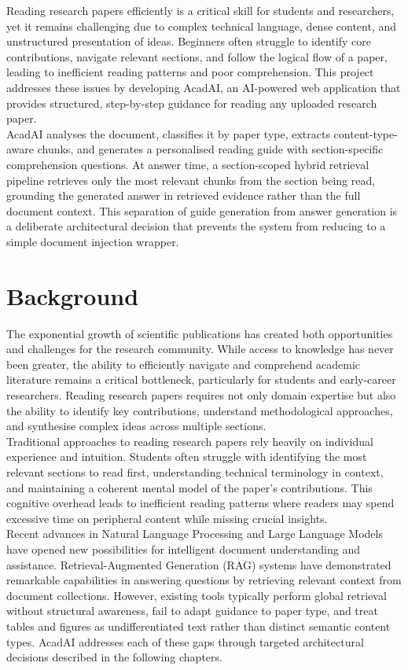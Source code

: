 \documentclass[12pt,a4paper]{report}
\begin{document}
Reading research papers efficiently is a critical skill for students and
researchers, yet it remains challenging due to complex technical language, dense
content, and unstructured presentation of ideas. Beginners often struggle to
identify core contributions, navigate relevant sections, and follow the logical
flow of a paper, leading to inefficient reading patterns and poor comprehension.
This project addresses these issues by developing AcadAI, an AI-powered web
application that provides structured, step-by-step guidance for reading any
uploaded research paper.\\
AcadAI analyses the document, classifies it by paper type, extracts
content-type-aware chunks, and generates a personalised reading guide with
section-specific comprehension questions. At answer time, a section-scoped
hybrid retrieval pipeline retrieves only the most relevant chunks from the
section being read, grounding the generated answer in retrieved evidence rather
than the full document context. This separation of guide generation from answer
generation is a deliberate architectural decision that prevents the system from
reducing to a simple document injection wrapper.

\section{Background}

The exponential growth of scientific publications has created both opportunities
and challenges for the research community. While access to knowledge has never
been greater, the ability to efficiently navigate and comprehend academic
literature remains a critical bottleneck, particularly for students and
early-career researchers. Reading research papers requires not only domain
expertise but also the ability to identify key contributions, understand
methodological approaches, and synthesise complex ideas across multiple
sections.\\
Traditional approaches to reading research papers rely heavily on individual
experience and intuition. Students often struggle with identifying the most
relevant sections to read first, understanding technical terminology in context,
and maintaining a coherent mental model of the paper's contributions. This
cognitive overhead leads to inefficient reading patterns where readers may spend
excessive time on peripheral content while missing crucial insights.\\
Recent advances in Natural Language Processing and Large Language Models have
opened new possibilities for intelligent document understanding and assistance.
Retrieval-Augmented Generation (RAG) systems have demonstrated remarkable
capabilities in answering questions by retrieving relevant context from document
collections. However, existing tools typically perform global retrieval without
structural awareness, fail to adapt guidance to paper type, and treat tables and
figures as undifferentiated text rather than distinct semantic content types.
AcadAI addresses each of these gaps through targeted architectural decisions
described in the following chapters.
\end{document}
